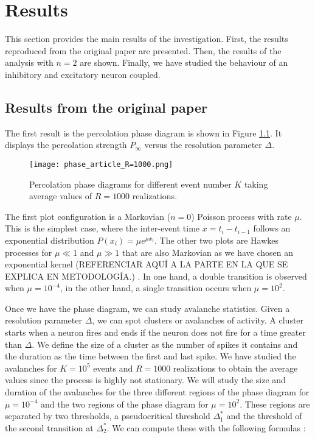 \chapter{Results} \label{ch:resultados}

This section provides the main results of the investigation. First, the results reproduced from the original paper \cite{notarmuzi2021percolation} are presented. Then, the results of
the analysis with $n=2$ are shown. Finally, we have studied the behaviour of an inhibitory and excitatory neuron coupled.

\section{Results from the original paper}

The first result is the percolation phase diagram is shown in Figure \ref{f:phase_diagram_article}. It displays the percolation strength $P_{\infty}$ versus the resolution parameter $\Delta$.

\begin{figure}[H]
    \centering
    \texttt{[image: phase\_article\_R=1000.png]}
    \caption{Percolation phase diagrams for different event number $K$ taking average values of $R=1000$ realizations.}
    \label{f:phase_diagram_article}
\end{figure}

The first plot configuration is a Markovian ($n=0$) Poisson process with rate $\mu$. This is the simplest case, where the inter-event time $x=t_i-t_{i-1}$ follows an exponential 
distribution $P(x_i)=\mu e^{\mu x_i}$. The other two plots are Hawkes processes for $\mu \ll 1$ and $\mu\gg 1$ that are also Markovian as we have chosen an exponential kernel (REFERENCIAR 
AQUÍ A LA PARTE EN LA QUE SE EXPLICA EN METODOLOGÍA.)
. In one hand, a double transition is observed when 
$\mu = 10^{-4}$, in the other hand, a single transition occurs when $\mu = 10^2$. 

Once we have the phase diagram, we can study avalanche statistics. Given a resolution parameter $\Delta$, we can spot clusters or avalanches of activity.
A cluster starts when a neuron fires and ends if the neuron does not fire for a time greater than $\Delta$. We define the size of a cluster as the number of spikes it contains and the duration
as the time between the first and last spike. We have studied the avalanches for $K=10^5$ events and $R=1000$ realizations to obtain the average values since the process is highly not 
stationary. We will study the size and duration of the avalanches for the three different regions of the phase diagram for $\mu=10^{-4}$ and the two regions of the phase diagram for $\mu=10^2$.
These regions are separated by two thresholds, a pseudocritical threshold $\Delta_1^*$ and the threshold of the second transition at $\Delta_2^*$.
We can compute these with the following formulas \cite{notarmuzi2021percolation}:



